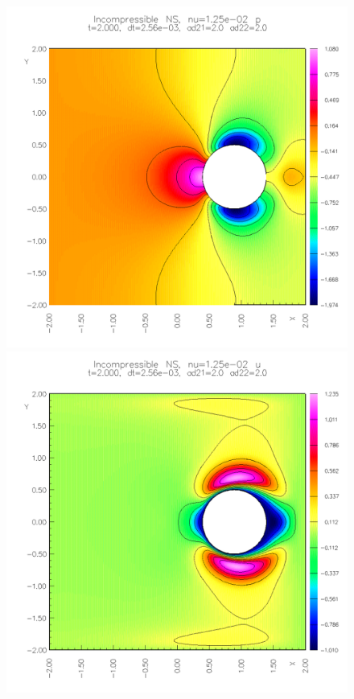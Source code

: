 {\begin{figure}
\begin{center}
\includegraphics[width=\figWidth]{figures/collide5-p-2p0}  
\includegraphics[width=\figWidth]{figures/collide5-u-2p0}  

\end{center}
\end{figure}}
